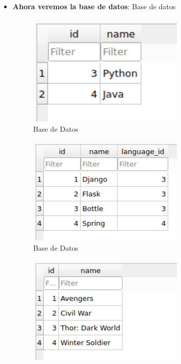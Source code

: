 \documentclass{article}
\begin{document}
    \begin{itemize}
        \item \textbf{Ahora veremos la base de datos}: Base de datos
        \begin{figure}[H]
            \centering
            \includegraphics[width=0.7\textwidth]{img/Cap1.png}
            \caption{Base de Datos}
        \end{figure}
        \begin{figure}[H]
            \centering
            \includegraphics[width=0.7\textwidth]{img/Cap2.png}
            \caption{Base de Datos}
        \end{figure}
        \begin{figure}[H]
            \centering
            \includegraphics[width=0.7\textwidth]{img/Cap3.png}

\end{figure}
\end{itemize}
\end{document}
